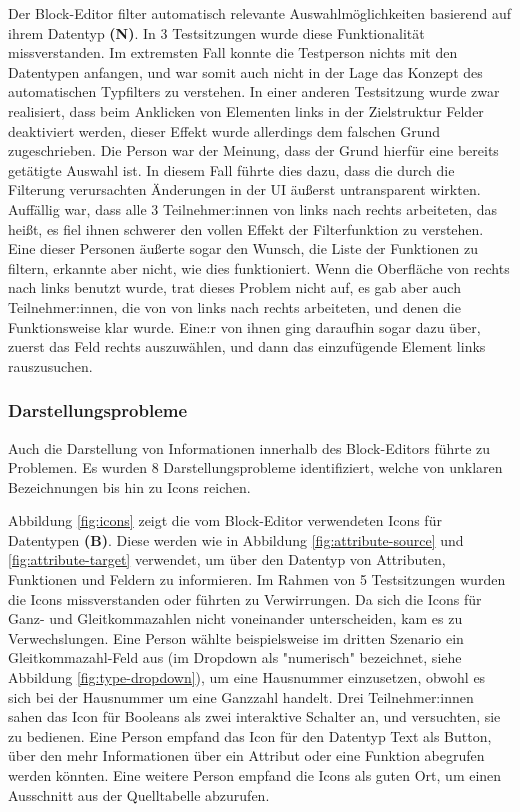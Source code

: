Der Block-Editor filter automatisch relevante Auswahlmöglichkeiten basierend auf ihrem Datentyp \textbf{(N)}. In 3 Testsitzungen wurde diese Funktionalität missverstanden. Im extremsten Fall konnte die Testperson nichts mit den Datentypen anfangen, und war somit auch nicht in der Lage das Konzept des automatischen Typfilters zu verstehen. In einer anderen Testsitzung wurde zwar realisiert, dass beim Anklicken von Elementen links in der Zielstruktur Felder deaktiviert werden, dieser Effekt wurde allerdings dem falschen Grund zugeschrieben. Die Person war der Meinung, dass der Grund hierfür eine bereits getätigte Auswahl ist. In diesem Fall führte dies dazu, dass die durch die Filterung verursachten Änderungen in der UI äußerst untransparent wirkten. Auffällig war, dass alle 3 Teilnehmer:innen von links nach rechts arbeiteten, das heißt, es fiel ihnen schwerer den vollen Effekt der Filterfunktion zu verstehen. Eine dieser Personen äußerte sogar den Wunsch, die Liste der Funktionen zu filtern, erkannte aber nicht, wie dies funktioniert. Wenn die Oberfläche von rechts nach links benutzt wurde, trat dieses Problem nicht auf, es gab aber auch Teilnehmer:innen, die von von links nach rechts arbeiteten, und denen die Funktionsweise klar wurde. Eine:r von ihnen ging daraufhin sogar dazu über, zuerst das Feld rechts auszuwählen, und dann das einzufügende Element links rauszusuchen.

\subsubsection{Darstellungsprobleme}

Auch die Darstellung von Informationen innerhalb des Block-Editors führte zu Problemen. Es wurden 8 Darstellungsprobleme identifiziert, welche von unklaren Bezeichnungen bis hin zu Icons reichen.

Abbildung \ref{fig:icons} zeigt die vom Block-Editor verwendeten Icons für Datentypen \textbf{(B)}. Diese werden wie in Abbildung \ref{fig:attribute-source} und \ref{fig:attribute-target} verwendet, um über den Datentyp von Attributen, Funktionen und Feldern zu informieren. Im Rahmen von 5 Testsitzungen wurden die Icons missverstanden oder führten zu Verwirrungen. Da sich die Icons für Ganz- und Gleitkommazahlen nicht voneinander unterscheiden, kam es zu Verwechslungen. Eine Person wählte beispielsweise im dritten Szenario ein Gleitkommazahl-Feld aus (im Dropdown als "numerisch" bezeichnet, siehe Abbildung \ref{fig:type-dropdown}), um eine Hausnummer einzusetzen, obwohl es sich bei der Hausnummer um eine Ganzzahl handelt.  Drei Teilnehmer:innen sahen das Icon für Booleans als zwei interaktive Schalter an, und versuchten, sie zu bedienen. Eine Person empfand das Icon für den Datentyp Text als Button, über den mehr Informationen über ein Attribut oder eine Funktion abegrufen werden könnten. Eine weitere Person empfand die Icons als guten Ort, um einen Ausschnitt aus der Quelltabelle abzurufen.

